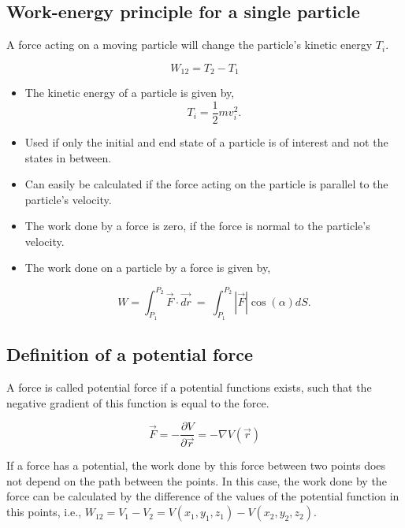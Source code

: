 \documentclass[10pt,a4paper]{scrartcl}
\begin{document}
\begin{multicols*}{2}
\subsection{Work-energy principle for a single particle}
A force acting on a moving particle will change the particle's kinetic energy $T_i$. 

\begin{equation*}
W_{12}=T_2-T_1
\end{equation*}

\begin{itemize}
\item The kinetic energy of a particle is given by,
\begin{equation*}
T_i = \frac{1}{2}mv_i^2.
\end{equation*}
\item Used if only the initial and end state of a particle is of interest and not the states in between.
\item Can easily be calculated if the force acting on the particle is parallel to the particle's velocity.
\item The work done by a force is zero, if the force is normal to the particle's velocity.
\item The work done on a particle by a force is given by,
	
	\begin{equation*}
	W = \int_{P_1}^{P_2}\vec{F}\cdot \vec{dr} \ =\ \int_{P_1}^{P_2}|\vec{F}|\cos(\alpha)dS.
	\end{equation*}  
\end{itemize}

\subsection{Definition of a potential force}
A force is called potential force if a potential functions exists, such that the negative gradient of this function is equal to the force.

\begin{equation*}
\vec{F}=-\frac{\partial V}{\partial \vec{r}}=-\nabla V(\vec{r})
\end{equation*}

If a force has a potential, the work done by this force between two points does not depend on the path between the points. In this case, the work done by the force can be calculated by the difference of the values of the potential function in this points, i.e., $W_{12} = V_1 - V_2 = V(x_1,y_1,z_1) - V(x_2,y_2,z_2)$.


\end{multicols*}
\end{document}
